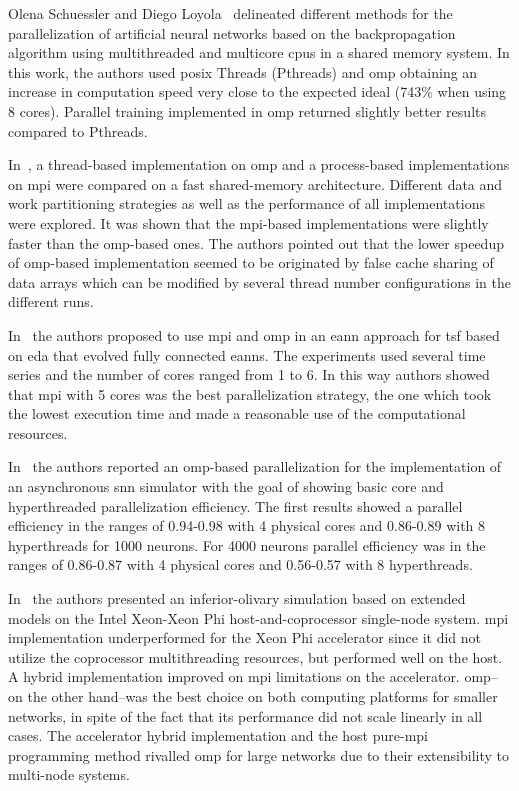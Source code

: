 \documentclass[11pt,a4paper]{article}
\begin{document}
Olena Schuessler and Diego Loyola~\cite{Schuessler:2011:PTA:1997052.1997062} delineated different methods for the parallelization of artificial neural networks based on the backpropagation algorithm using multithreaded and multicore \glspl{cpu} in a shared memory system. In this work, the authors used \gls{posix} Threads (Pthreads) and \gls{omp} obtaining an increase in computation speed very close to the expected ideal (743\% when using 8 cores). Parallel training implemented in \gls{omp} returned slightly better results compared to Pthreads.

In~\cite{Strey2003ACO}, a thread-based implementation on \gls{omp} and a process-based implementations on \gls{mpi} were compared on a fast shared-memory architecture. Different data and work partitioning strategies as well as the performance of all implementations were explored. It was shown that the \gls{mpi}-based implementations were slightly faster than the \gls{omp}-based ones. The authors pointed out that the lower speedup of \gls{omp}-based implementation seemed to be originated by false cache sharing of data arrays which can be modified by several thread number configurations in the different runs.

In~\cite{6232827} the authors proposed to use \gls{mpi} and \gls{omp} in an \gls{eann} approach for \gls{tsf} based on \gls{eda} that evolved fully connected \glspl{eann}. The experiments used several time series and the number of cores ranged from 1 to 6. In this way authors showed that \gls{mpi} with 5 cores was the best parallelization strategy, the one which took the lowest execution time and made a reasonable use of the computational resources.

In~\cite{6511739} the authors reported an \gls{omp}-based parallelization for the implementation of an asynchronous \gls{snn} simulator with the goal of showing basic core and hyperthreaded parallelization efficiency. The first results showed a parallel efficiency in the ranges of 0.94-0.98 with 4 physical cores and 0.86-0.89 with 8 hyperthreads for 1000 neurons. For 4000 neurons parallel efficiency was in the ranges of 0.86-0.87 with 4 physical cores and 0.56-0.57 with 8 hyperthreads.

In~\cite{Chatzikonstantis:2016:FID:2903150.2903477} the authors presented an inferior-olivary simulation based on extended  models on the Intel Xeon-Xeon Phi host-and-coprocessor single-node system. \gls{mpi} implementation underperformed for the Xeon Phi accelerator since it did not utilize the coprocessor multithreading resources, but performed well on the host. A hybrid implementation improved on \gls{mpi} limitations on the accelerator. \gls{omp}--on the other hand--was the best choice on both computing platforms for smaller networks, in spite of the fact that its performance did not scale linearly in all cases. The accelerator hybrid implementation and the host pure-\gls{mpi} programming method rivalled \gls{omp} for large networks due to their extensibility to multi-node systems.
\end{document}
